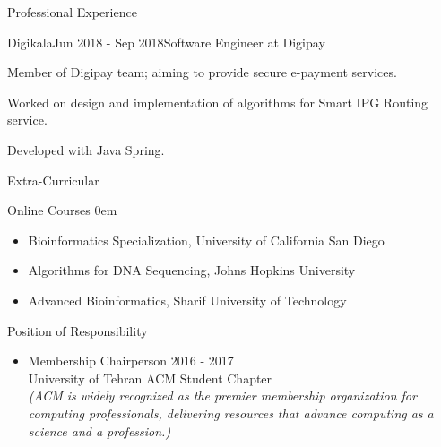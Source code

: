 \documentclass{resume}
\begin{document}

\begin{rSection}{Professional Experience}

\begin{rSubsection}{Digikala}{Jun 2018 - Sep 2018}{Software Engineer at Digipay}{}
\item Member of Digipay team; aiming to provide secure e-payment services.
\item Worked on design and implementation of algorithms for Smart IPG Routing service.
\item Developed with Java Spring.
\end{rSubsection}

\end{rSection}



\begin{rSection}{Extra-Curricular} \itemsep -4pt

\begin{rSubsection}{Online Courses}{}{}{}
\itemsep0em 
\begin{itemize}
    \item Bioinformatics Specialization, University of California San Diego
    \item Algorithms for DNA Sequencing, Johns Hopkins University
    \item Advanced Bioinformatics, Sharif University of Technology
\end{itemize}
\end{rSubsection}

\begin{rSubsection}{Position of Responsibility}{}{}{}
\begin{itemize}
    \item Membership Chairperson \hfill {2016 - 2017}
    \\ {University of Tehran ACM Student Chapter}
    \\ \textit{(ACM is widely recognized as the premier membership organization for computing professionals, delivering resources that advance computing as a science and a profession.)}
\end{itemize}
\end{rSubsection}

\end{rSection}
\end{document}
